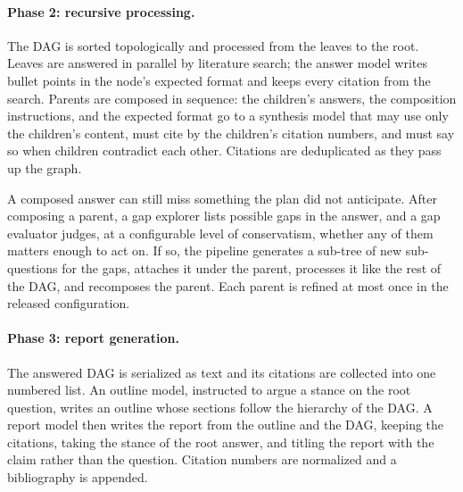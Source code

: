 \paragraph{Phase 2: recursive processing.}
The DAG is sorted topologically and processed from the leaves to the root. Leaves are answered in parallel by literature search; the answer model writes bullet points in the node's expected format and keeps every citation from the search. Parents are composed in sequence: the children's answers, the composition instructions, and the expected format go to a synthesis model that may use only the children's content, must cite by the children's citation numbers, and must say so when children contradict each other. Citations are deduplicated as they pass up the graph.

A composed answer can still miss something the plan did not anticipate. After composing a parent, a gap explorer lists possible gaps in the answer, and a gap evaluator judges, at a configurable level of conservatism, whether any of them matters enough to act on. If so, the pipeline generates a sub-tree of new sub-questions for the gaps, attaches it under the parent, processes it like the rest of the DAG, and recomposes the parent. Each parent is refined at most once in the released configuration.

\paragraph{Phase 3: report generation.}
The answered DAG is serialized as text and its citations are collected into one numbered list. An outline model, instructed to argue a stance on the root question, writes an outline whose sections follow the hierarchy of the DAG. A report model then writes the report from the outline and the DAG, keeping the citations, taking the stance of the root answer, and titling the report with the claim rather than the question. Citation numbers are normalized and a bibliography is appended.

